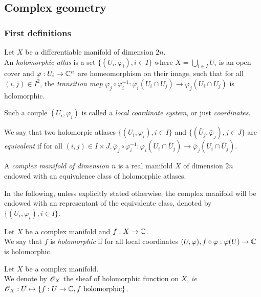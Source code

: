 \subsection{Complex geometry}

\subsubsection{First definitions}

\begin{mydef}
Let $X$ be a differentiable manifold of dimension $2n$.\\
An \textit{holomorphic atlas} is a set $\{(U_i,\varphi_i),i\in I\}$ where $X = \bigcup_{i\in I} U_i$ is an open cover and $\varphi : U_i \to \mathbb{C}^n$ are homeomorphism on their image, such that for all $(i,j)\in I^2$, the \textit{transition map} $\varphi_j \circ \varphi_i^{-1} : \varphi_i(U_i \cap U_j) \to \varphi_j(U_i \cap U_j)$ is holomorphic. 

\smallskip
Such a couple $(U_i,\varphi_i)$ is called a \textit{local coordinate system}, or just \textit{coordinates}.

\smallskip
We say that two holomorpic atlases $\{(U_i,\varphi_i),i\in I\}$ and $\{(\tilde{U_j},\tilde{\varphi_j}),j\in J\}$ are \textit{equivalent} if for all $(i,j)\in I\times J, \tilde{\varphi_j} \circ \varphi_i^{-1} : \varphi_i(U_i \cap \tilde{U_j}) \to \tilde{\varphi_j}(U_i \cap \tilde{U_j})$.
\end{mydef}

\begin{mydef}
A \textit{complex manifold of dimension $n$} is a real manifold $X$ of dimension $2n$ endowed with an equivalence class of holomorphic atlases. 
\end{mydef}

\begin{myrem}
In the following, unless explicitly stated otherwise, the complex manifold will be endowed with an representant of the equivalente class, denoted by $\{(U_i,\varphi_i),i\in I\}$.
\end{myrem}

\begin{mydef}
Let $X$ be a complex manifold and $f : X \to \mathbb{C}$.\\
We say that $f$ is \textit{holomorphic} if for all local coordinates $(U,\varphi), f\circ \varphi : \varphi(U) \to \mathbb{C}$ is holomorphic.
\end{mydef}

\begin{mydef}
Let $X$ be a complex manifold.\\
We denote by $\mathscr{O}_X$ the sheaf of holomorphic function on $X$, \textit{ie} $\mathscr{O}_X : U \mapsto \{f:U \to \mathbb{C}, f\text{ holomorphic}\}$.
\end{mydef}

